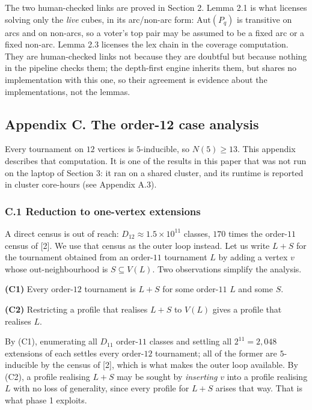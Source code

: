\documentclass[
]{article}
\begin{document}
The two human-checked links are proved in Section 2. Lemma 2.1 is what
licenses solving only the \emph{live} cubes, in its arc/non-arc form:
\(\mathrm{Aut}(P_q)\) is transitive on arcs and on non-arcs, so a
voter's top pair may be assumed to be a fixed arc or a fixed non-arc.
Lemma 2.3 licenses the lex chain in the coverage computation. They are
human-checked links not because they are doubtful but because nothing in
the pipeline checks them; the depth-first engine inherits them, but
shares no implementation with this one, so their agreement is evidence
about the implementations, not the lemmas.

\subsection{Appendix C. The order-12 case
analysis}\label{appendix-c.-the-order-12-case-analysis}

Every tournament on \(12\) vertices is \(5\)-inducible, so
\(N(5) \ge 13\). This appendix describes that computation. It is one of
the results in this paper that was not run on the laptop of Section 3:
it ran on a shared cluster, and its runtime is reported in cluster
core-hours (see Appendix A.3).

\subsubsection{C.1 Reduction to one-vertex
extensions}\label{c.1-reduction-to-one-vertex-extensions}

A direct census is out of reach: \(D_{12} \approx 1.5 \times 10^{11}\)
classes, \(170\) times the order-\(11\) census of {[}2{]}. We use that
census as the outer loop instead. Let us write \(L + S\) for the
tournament obtained from an order-\(11\) tournament \(L\) by adding a
vertex \(v\) whose out-neighbourhood is \(S \subseteq V(L)\). Two
observations simplify the analysis.

\textbf{(C1)} Every order-\(12\) tournament is \(L + S\) for some
order-\(11\) \(L\) and some \(S\).

\textbf{(C2)} Restricting a profile that realises \(L + S\) to \(V(L)\)
gives a profile that realises \(L\).

By (C1), enumerating all \(D_{11}\) order-\(11\) classes and settling
all \(2^{11} = 2{,}048\) extensions of each settles every order-\(12\)
tournament; all of the former are \(5\)-inducible by the census of
{[}2{]}, which is what makes the outer loop available. By (C2), a
profile realising \(L + S\) may be sought by \emph{inserting} \(v\) into
a profile realising \(L\) with no loss of generality, since every
profile for \(L+S\) arises that way. That is what phase 1 exploits.
\end{document}
